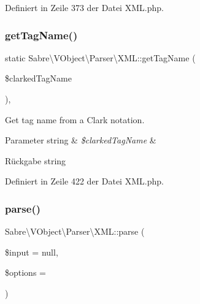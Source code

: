 Definiert in Zeile 373 der Datei X\+M\+L.\+php.

\mbox{\label{class_sabre_1_1_v_object_1_1_parser_1_1_x_m_l_a1fc350d905dae632556bf9226621b5fd}} 
\subsubsection{\texorpdfstring{get\+Tag\+Name()}{getTagName()}}
{\footnotesize\ttfamily static Sabre\textbackslash{}\+V\+Object\textbackslash{}\+Parser\textbackslash{}\+X\+M\+L\+::get\+Tag\+Name (\begin{DoxyParamCaption}\item[{}]{\$clarked\+Tag\+Name }\end{DoxyParamCaption})\hspace{0.3cm}{\ttfamily [static]}, {\ttfamily [protected]}}

Get tag name from a Clark notation.


\begin{DoxyParams}[1]{Parameter}
string & {\em \$clarked\+Tag\+Name} & \\
\hline
\end{DoxyParams}
\begin{DoxyReturn}{Rückgabe}
string 
\end{DoxyReturn}


Definiert in Zeile 422 der Datei X\+M\+L.\+php.

\mbox{\label{class_sabre_1_1_v_object_1_1_parser_1_1_x_m_l_a45dd53da3166c19ffd1a3184bb60f578}} 
\subsubsection{\texorpdfstring{parse()}{parse()}}
{\footnotesize\ttfamily Sabre\textbackslash{}\+V\+Object\textbackslash{}\+Parser\textbackslash{}\+X\+M\+L\+::parse (\begin{DoxyParamCaption}\item[{}]{\$input = {\ttfamily null},  }\item[{}]{\$options = {} }\end{DoxyParamCaption})}

